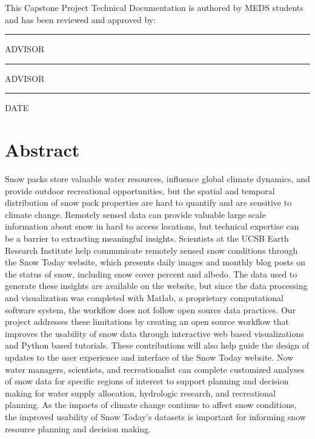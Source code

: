 \documentclass[
]{book}
\begin{document}
This Capstone Project Technical Documentation is authored by MEDS students and has been reviewed and approved by:

\begin{center}\rule{0.5\linewidth}{0.5pt}\end{center}

ADVISOR

\begin{center}\rule{0.5\linewidth}{0.5pt}\end{center}

ADVISOR

\begin{center}\rule{0.5\linewidth}{0.5pt}\end{center}

DATE

\hypertarget{abstract}{%
\chapter{Abstract}\label{abstract}}

Snow packs store valuable water resources, influence global climate dynamics, and provide outdoor recreational opportunities, but the spatial and temporal distribution of snow pack properties are hard to quantify and are sensitive to climate change. Remotely sensed data can provide valuable large scale information about snow in hard to access locations, but technical expertise can be a barrier to extracting meaningful insights. Scientists at the UCSB Earth Research Institute help communicate remotely sensed snow conditions through the Snow Today website, which presents daily images and monthly blog posts on the status of snow, including snow cover percent and albedo. The data used to generate these insights are available on the website, but since the data processing and visualization was completed with Matlab, a proprietary computational software system, the workflow does not follow open source data practices. Our project addresses these limitations by creating an open source workflow that improves the usability of snow data through interactive web based visualizations and Python based tutorials. These contributions will also help guide the design of updates to the user experience and interface of the Snow Today website. Now water managers, scientists, and recreationalist can complete customized analyses of snow data for specific regions of interest to support planning and decision making for water supply allocation, hydrologic research, and recreational planning. As the impacts of climate change continue to affect snow conditions, the improved usability of Snow Today's datasets is important for informing snow resource planning and decision making.
\end{document}
